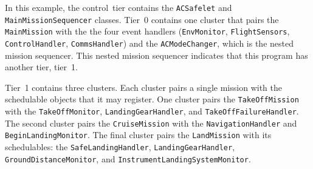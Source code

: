\documentclass[10pt,a4paper]{article}
\begin{document}
In this example, the control~tier contains the \texttt{ACSafelet} and \texttt{MainMissionSequencer} classes. Tier~0 contains one cluster that pairs the \texttt{MainMission} with the the four event handlers (\texttt{EnvMonitor}, \texttt{FlightSensors}, \texttt{ControlHandler}, \texttt{CommsHandler}) and the \texttt{ACModeChanger}, which is the nested mission sequencer. This nested mission sequencer indicates that this program has another tier, tier~1.

Tier~1 contains three clusters. Each cluster pairs a single mission with the schedulable objects that it may register. One cluster pairs the \texttt{TakeOffMission} with the \texttt{TakeOffMonitor}, \texttt{LandingGearHandler}, and \texttt{TakeOffFailureHandler}. The second cluster pairs the \texttt{CruiseMission} with the \texttt{NavigationHandler} and \texttt{BeginLandingMonitor}. The final cluster pairs the \texttt{LandMission} with its schedulables: the \texttt{SafeLandingHandler}, \texttt{LandingGearHandler}, \texttt{GroundDistanceMonitor}, and \texttt{InstrumentLandingSystemMonitor}. 
\end{document}
